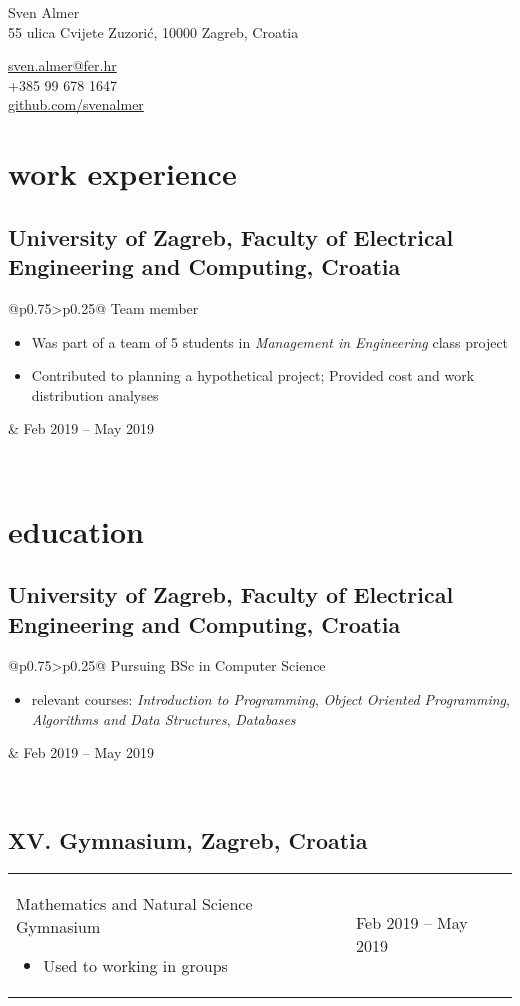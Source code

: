 \documentclass[a4paper]{article}
\makeatletter
\newlength{\tablewidth}
\newenvironment{period}[2]{%
\newcommand{\sarma}{#2}%
\setlength{\tablewidth}{\linewidth}
\addtolength{\tablewidth}{-2\tabcolsep}
\begin{tabular}{@{}p{0.75\tablewidth}>{\raggedleft\arraybackslash}p{0.25\tablewidth}@{}}%
#1 \newline
\begin{itemize}
}{%
\end{itemize} & \sarma \\%
\end{tabular}\\
}
\makeatother
\begin{document}
\fontfamily{\sfdefault}
\selectfont

\begin{minipage}{.5\textwidth}
\LARGE{Sven Almer}\\
\normalsize{55 ulica Cvijete Zuzorić, 10000 Zagreb, Croatia}
\end{minipage}%
\begin{minipage}{.5\textwidth}
\raggedleft
\href{mailto:ime.prezime@gmail.com}{sven.almer@fer.hr} \\
+385 99 678 1647 \\
\href{https://github.com/iprezime}{github.com/svenalmer}
\end{minipage}

\vspace{1em}

\section{work experience}
\subsection{University of Zagreb, Faculty of Electrical Engineering and Computing, Croatia}
\begin{period}{Team member}{Feb 2019 -- May 2019}
\item Was part of a team of 5 students in \textit{Management in Engineering} class project
\item Contributed to planning a hypothetical project; Provided cost and work distribution analyses
\end{period}

\section{education}
\subsection{University of Zagreb, Faculty of Electrical Engineering and Computing, Croatia}
\begin{period}{Pursuing BSc in Computer Science}{Sep 2018 -- May 2021\linebreak(expected)}
    \item relevant courses:
        \textit{Introduction to Programming},
        \textit{Object Oriented Programming},
        \textit{Algorithms and Data Structures},
        \textit{Databases}
\end{period}
\subsection{XV. Gymnasium, Zagreb, Croatia}
\begin{period}{Mathematics and Natural Science Gymnasium}{Sep 2014 -- May 2018}
\item Used to working in groups
\end{period}
\end{document}

